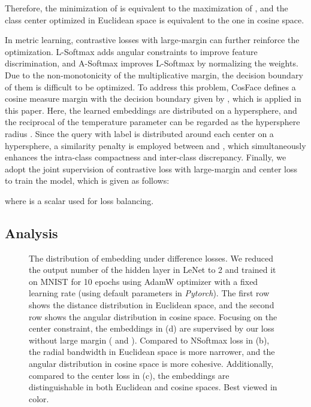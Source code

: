 \documentclass[10pt,twocolumn,letterpaper]{article}
\begin{document}
Therefore, the minimization of  is equivalent to the maximization of , and the class center optimized in Euclidean space is equivalent to the one in cosine space.

In metric learning, contrastive losses with large-margin can further reinforce the optimization. L-Softmax \cite{lsoftmax} adds angular constraints to improve feature discrimination, and A-Softmax \cite{sphereface} improves L-Softmax by normalizing the weights. Due to the non-monotonicity of the multiplicative margin, the decision boundary of them is difficult to be optimized. To address this problem, CosFace \cite{cosface} defines a cosine measure margin  with the decision boundary given by , which is applied in this paper. Here, the learned embeddings are distributed on a hypersphere, and the reciprocal of the temperature parameter  can be regarded as the hypersphere radius . Since the query  with label  is distributed around each center  on a hypersphere, a similarity penalty  is employed between  and , which simultaneously enhances the intra-class compactness and inter-class discrepancy. Finally, we adopt the joint supervision of contrastive loss with large-margin and center loss to train the model, which is given as follows:

where  is a scalar used for loss balancing.


\subsection{Analysis}

\begin{figure*}[ht!]
\centering
{}\quad
{}\quad
{}\quad
{}\quad
\caption{The distribution of embedding under difference losses. We reduced the output number of the hidden layer in LeNet to 2 and trained it on MNIST \cite{lenet} for 10 epochs using AdamW optimizer \cite{adamw} with a fixed learning rate (using default parameters in \textit{Pytorch}). The first row shows the distance distribution in Euclidean space, and the second row shows the angular distribution in cosine space. Focusing on the center constraint, the embeddings in (d) are supervised by our loss without large margin ( and ). Compared to NSoftmax loss in (b), the radial bandwidth in Euclidean space is more narrower, and the angular distribution in cosine space is more cohesive. Additionally, compared to the center loss in (c), the embeddings are distinguishable in both Euclidean and cosine spaces. Best viewed in color.
} 
\label{fig:mnist}
\end{figure*}
\end{document}
